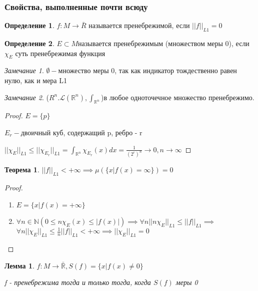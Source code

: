 \documentclass[a4paper, 12pt]{article}
\newtheorem{theorem}{Теорема}[section]
\newtheorem{lemma}{Лемма}[section]
\theoremstyle{definition}
\newtheorem*{definition}{Определение}
\theoremstyle{remark}
\newtheorem*{remark}{Замечание}
\begin{document}
\subsubsection{Свойства, выполненные почти всюду}
\begin{definition}
     $f: M\to \bar{R}$ называется пренебрежимой, если $||f||_{L1} = 0$
\end{definition}
\begin{definition}
     $E\subset M$называется пренебрежимым (множеством меры 0), если $\chi_E$ суть пренебрежимая функция
\end{definition}
\begin{remark}
     $\emptyset - $множество меры 0, так как индикатор тождественно равен нулю, как и мера L1
\end{remark}
\begin{remark}
     ($R^n. \mathcal{L} (\mathbb{R} ^n), \int_{\mathbb{R} ^n}$)в любое одноточечное множество пренебрежимо. 
\end{remark}
\begin{proof}
     $E = \{p\}$

     $E_r - $двоичный куб, содержащий p, ребро - r

     $||\chi_E||_{L1}\leq ||\chi_{E_r}||_{L1} = \int_{\mathbb{R} ^n}\chi_{E_r}(x)dx = \frac{1}{(2^r)^n}\to 0, n\to \infty$
\end{proof}
\begin{theorem}
     $||f||_{L1}< +\infty\implies \mu(\{x | f(x) = \infty\}) = 0$
\end{theorem}
\begin{proof}
     \begin{enumerate}
          \item $E =\{x|f(x)=+\infty\}$ 
          \item $\forall n \in \mathbb{N} (0\leq n \chi_E(x)\leq |f(x)|)\implies \forall n ||n\chi_E||_{L1} \leq ||f||_{L1}\implies$
          $\forall n ||\chi_E||_{L1}\leq \frac{1}{n}||f||_{L1}< +\infty\implies ||\chi_E||_{L1} = 0$
     \end{enumerate}
\end{proof}
\begin{lemma}
     $f:M\to\bar{\mathbb{R} }, S(f) = \{x | f(x)\neq 0\}$

     f - пренебрежима тогда и только тогда, когда $S(f)$ меры 0
\end{lemma}
\end{document}
